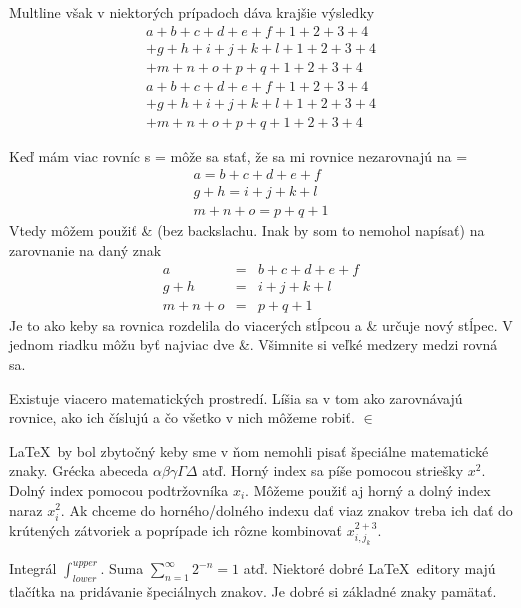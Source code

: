 \documentclass[11pt, a4paper]{article}
\begin{document}
Multline však v niektorých prípadoch dáva krajšie výsledky
\begin{multline}
a + b + c + d + e + f + 1 + 2 + 3 + 4 \\
+ g + h + i + j + k + l + 1 + 2 + 3 + 4\\
+ m + n + o + p + q + 1 + 2 + 3 + 4
\end{multline}
\begin{eqnarray}
a + b + c + d + e + f + 1 + 2 + 3 + 4  \nonumber\\
+ g + h + i + j + k + l + 1 + 2 + 3 + 4 \nonumber\\
+ m + n + o + p + q + 1 + 2 + 3 + 4
\end{eqnarray}

Keď mám viac rovníc s = môže sa stať, že sa mi rovnice nezarovnajú na =
\begin{eqnarray}
a = b + c + d + e + f  \\
 g + h = i + j + k + l  \\
 m + n + o = p + q + 1 
\end{eqnarray}
Vtedy môžem použiť \& (bez backslachu. Inak by som to nemohol napísať) na zarovnanie na daný znak
\begin{eqnarray}
a &=& b + c + d + e + f  \\
 g + h &=& i + j + k + l  \\
 m + n + o &=& p + q + 1 
\end{eqnarray}
Je to ako keby sa rovnica rozdelila do viacerých stĺpcou a \& určuje nový stĺpec. V jednom riadku môžu byť najviac dve \&. Všimnite si veľké medzery medzi rovná sa.

Existuje viacero matematických prostredí. Líšia sa v tom ako zarovnávajú rovnice, ako ich číslujú a čo všetko v nich môžeme robiť.
$\in$

\LaTeX\ by bol zbytočný keby sme v ňom nemohli pisať špeciálne matematické znaky. Grécka abeceda $\alpha \beta \gamma \Gamma \Delta$ atď. Horný index sa píše pomocou striešky $x^2$. Dolný index pomocou podtržovníka $x_i$. Môžeme použiť aj horný a dolný index naraz $x^2_i$. Ak chceme do horného/dolného indexu dať viaz znakov treba ich dať do krútených zátvoriek a poprípade ich rôzne kombinovať $x^{2+3}_{i,j_k}$.

Integrál $\int_{lower}^{upper}$. Suma $\sum_{n=1}^{\infty} 2^{-n} = 1$ atď. Niektoré dobré \LaTeX\ editory majú tlačítka na pridávanie špeciálnych znakov. Je dobré si základné znaky pamätať.
\end{document}
